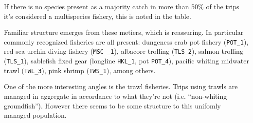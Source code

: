 \documentclass[]{article}
\begin{document}
If there is no species present as a majority catch in more than 50\% of
the trips it's considered a multispecies fishery, this is noted in the
table.

Familiar structure emerges from these metiers, which is reassuring. In
particular commonly recognized fisheries are all present: dungeness crab
pot fishery (\texttt{POT\_1}), red sea urchin diving fishery
(\texttt{MSC \_1}), albacore trolling (\texttt{TLS\_2}), salmon trolling
(\texttt{TLS\_1}), sablefish fixed gear (longline \texttt{HKL\_1}, pot
\texttt{POT\_4}), pacific whiting midwater trawl (\texttt{TWL\_3}), pink
shrimp (\texttt{TWS\_1}), among others.

One of the more interesting angles is the trawl fisheries. Trips using
trawls are managed in aggregate in accordance to what they're not (i.e.
``non-whiting groundfish''). However there seems to be some structure to
this unifomly managed population.
\end{document}
